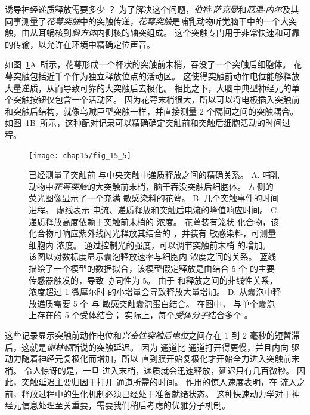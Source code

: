 诱导神经递质释放需要多少 ？ 
为了解决这个问题，\textit{伯特$\cdot$萨克曼}和\textit{厄温$\cdot$内尔}及其同事测量了\textit{花萼突触}中的突触传递，\textit{花萼突触}是哺乳动物听觉脑干中的一个大突触，由从耳蜗核到\textit{斜方体}内侧核的轴突组成。
这个突触专门用于非常快速和可靠的传输，以允许在环境中精确定位声音。


如图~\ref{fig:15_5}A~所示，花萼形成一个杯状的突触前末梢，吞没了一个突触后细胞体。
花萼突触包括近千个作为独立释放位点的活动区。
这使得突触前动作电位能够释放大量递质，从而导致可靠的大突触后去极化。
相比之下，大脑中典型神经元的单个突触按钮仅包含一个活动区。
因为花萼末梢很大，所以可以将电极插入突触前和突触后结构，就像乌贼巨型突触一样，并直接测量 2 个隔间之间的突触耦合。
如图~\ref{fig:15_5}B~所示，这种配对记录可以精确确定突触前和突触后细胞活动的时间过程。


\begin{figure}[htbp]
	\centering
	\texttt{[image: chap15/fig\_15\_5]}
	\caption{已经测量了突触前  与中央突触中递质释放之间的精确关系\cite{meinrenken2003hodgkin,sun2007dual}。
	A. 哺乳动物中\textit{花萼突触}的大突触前末梢，脑干吞没突触后细胞体。
	左侧的荧光图像显示了一个充满  敏感染料的花萼。
	B. 几个突触事件的时间进程。
	虚线表示  电流、递质释放和突触后电流的峰值响应时间。
	C. 递质释放高度依赖于突触前末梢的  浓度。
	花萼装有笼状  化合物，该化合物可响应紫外线闪光释放其结合的 ，并装有  敏感染料，可测量细胞内  浓度。
	通过控制光的强度，可以调节突触前末梢  的增加。
	该图以对数标度显示囊泡释放速率与细胞内  浓度之间的关系。
	蓝线描绘了一个模型的数据拟合，该模型假定释放是由结合 5 个  的主要  传感器触发的，导致  协同性为 5。
	由于  和释放之间的非线性关系，浓度超过 1 微摩尔时  的小增量会导致释放大量增加。
	D. 从囊泡中释放递质需要 5 个  与  敏感突触囊泡蛋白结合。
	在图中， 与单个囊泡上存在的 5 个受体结合；
	实际上，每个\textit{受体分子}结合多个 。}
	\label{fig:15_5}
\end{figure}


这些记录显示突触前动作电位和\textit{兴奋性突触后电位}之间存在 1 到 2 毫秒的短暂滞后，这就是\textit{谢林顿}所说的突触延迟。
因为  通道比  通道打开得更慢，并且内向  驱动力随着神经元复极化而增加，所以  直到膜开始复极化才开始全力进入突触前末梢。
令人惊讶的是，一旦  进入末梢，递质就会迅速释放，延迟只有几百微秒。
因此，突触延迟主要归因于打开  通道所需的时间。
 作用的惊人速度表明，在  流入之前，释放过程中的生化机制必须已经处于准备就绪状态。 
这种快速动力学对于神经元信息处理至关重要，需要我们稍后考虑的优雅分子机制。


